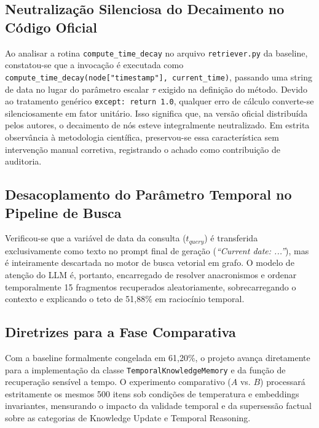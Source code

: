 \documentclass[10pt,conference,twocolumn]{IEEEtran}
\begin{document}
\subsection{Neutralização Silenciosa do Decaimento no Código Oficial}
Ao analisar a rotina \texttt{compute\_time\_decay} no arquivo \texttt{retriever.py} da baseline, constatou-se que a invocação é executada como \texttt{compute\_time\_decay(node["timestamp"], current\_time)}, passando uma string de data no lugar do parâmetro escalar $\tau$ exigido na definição do método. Devido ao tratamento genérico \texttt{except: return 1.0}, qualquer erro de cálculo converte-se silenciosamente em fator unitário. Isso significa que, na versão oficial distribuída pelos autores, o decaimento de nós esteve integralmente neutralizado. Em estrita observância à metodologia científica, preservou-se essa característica sem intervenção manual corretiva, registrando o achado como contribuição de auditoria.

\subsection{Desacoplamento do Parâmetro Temporal no Pipeline de Busca}
Verificou-se que a variável de data da consulta ($t_{query}$) é transferida exclusivamente como texto no prompt final de geração (\textit{``Current date: ...''}), mas é inteiramente descartada no motor de busca vetorial em grafo. O modelo de atenção do LLM é, portanto, encarregado de resolver anacronismos e ordenar temporalmente 15 fragmentos recuperados aleatoriamente, sobrecarregando o contexto e explicando o teto de 51,88\% em raciocínio temporal.

\subsection{Diretrizes para a Fase Comparativa}
Com a baseline formalmente congelada em 61,20\%, o projeto avança diretamente para a implementação da classe \texttt{TemporalKnowledgeMemory} e da função de recuperação sensível a tempo. O experimento comparativo ($A$ vs. $B$) processará estritamente os mesmos 500 itens sob condições de temperatura e embeddings invariantes, mensurando o impacto da validade temporal e da supersessão factual sobre as categorias de Knowledge Update e Temporal Reasoning.
\end{document}

